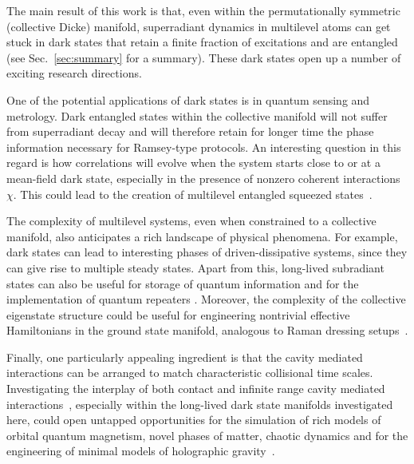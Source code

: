 \documentclass[aps,prx,superscriptaddress,twocolumn,notitlepage,nofootinbib,longbibliography]{revtex4-2}
\begin{document}
The main result of this work is that, even within the permutationally symmetric (collective Dicke) manifold, superradiant dynamics in multilevel atoms can get stuck in dark states that retain a finite fraction of excitations and are entangled (see Sec.~\ref{sec:summary} for a summary).
These dark states open up a number of exciting research directions.

One of the potential applications of dark states is in quantum sensing and metrology. Dark entangled states within the collective manifold  will not suffer from superradiant decay and will therefore retain for longer time the phase information necessary for Ramsey-type protocols. An interesting question in this regard is how correlations will evolve when the system starts close to or at a mean-field dark state, especially in the presence of nonzero coherent interactions $\chi$. This could lead to the creation of multilevel entangled squeezed states~\cite{MolmerKurucz_PRA81,Toth_PRA89}.

The complexity of multilevel systems, even when constrained to a collective manifold, also anticipates a rich landscape of physical phenomena. For example, dark states can lead to interesting phases of driven-dissipative systems, since they can give rise to multiple steady states. Apart from this, long-lived subradiant states can also be useful for storage of quantum information and for the implementation of quantum repeaters \cite{Sangouard2011}. Moreover, the complexity of the collective eigenstate structure could be useful for engineering nontrivial effective Hamiltonians in the ground state manifold, analogous to Raman dressing setups~\cite{AltmanSchleierSmith_PRX2019}.

Finally, one particularly appealing ingredient is that the cavity mediated interactions  can be arranged to match characteristic collisional time scales.
Investigating  the interplay of both contact  and infinite range cavity mediated interactions~\cite{Belyansky2020}, especially within the long-lived dark state manifolds investigated here, could open untapped opportunities for   the  simulation of rich models of orbital  quantum magnetism, novel phases of matter, chaotic dynamics and for the engineering of  minimal models of holographic gravity~\cite{Kitaev,Sachdev1993}.











\end{document}
